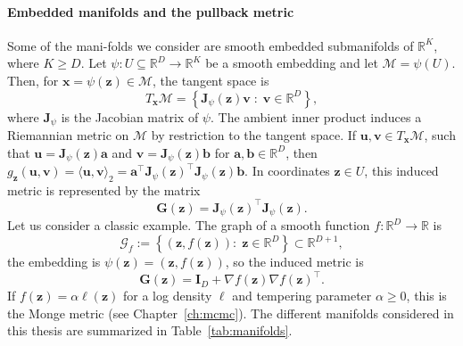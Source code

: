 \paragraph{Embedded manifolds and the pullback metric}
Some of the mani-folds we consider are smooth embedded submanifolds of  $\mathbb{R}^K$, where $K\geq D$. Let $\psi:U\subseteq\mathbb{R}^D\to \mathbb{R}^K$ be a smooth embedding and let $\mathcal{M}=\psi(U)$.
Then, for $\boldsymbol{x} = \psi(\boldsymbol{z})\in \mathcal{M}$, the tangent space is
\begin{equation*}
T_{\boldsymbol{x}}\mathcal{M}
=
\left\{
\mathbf{J}_{\psi}(\boldsymbol{z})\boldsymbol{v}
\;:\;
\boldsymbol{v}\in\mathbb{R}^D
\right\},
\end{equation*}
where  $\mathbf{J}_{\psi}$ is the Jacobian matrix of  $\psi$. 
The ambient inner product induces a Riemannian metric on $\mathcal{M}$ by restriction to the tangent space.
If $\boldsymbol{u},\boldsymbol{v}\in T_{\boldsymbol{x}}\mathcal{M}$, 
such that $\boldsymbol{u} = \mathbf{J}_{\psi}(\boldsymbol{z}) \boldsymbol{a}$ and $\boldsymbol{v} = \mathbf{J}_{\psi}(\boldsymbol{z}) \boldsymbol{b}$ for $\boldsymbol{a}, \boldsymbol{b}\in \mathbb{R}^D$,
then
$g_{\boldsymbol{z}}(\boldsymbol{u},\boldsymbol{v})=\langle \boldsymbol{u},\boldsymbol{v}\rangle_2 = 
 \boldsymbol{a}^\top \mathbf{J}_{\psi}(\boldsymbol{z})^\top \mathbf{J}_{\psi}(\boldsymbol{z}) \boldsymbol{b}
$.
In coordinates $\boldsymbol{z}\in U$, this induced metric is represented by the matrix
\begin{equation*}
\mathbf{G}(\boldsymbol{z})
=
\mathbf{J}_{\psi}(\boldsymbol{z})^\top \mathbf{J}_{\psi}(\boldsymbol{z}).
\end{equation*}
Let us consider a classic example. The graph of a smooth function $f:\mathbb{R}^D\to\mathbb{R}$ is
\begin{equation*}
\mathcal{G}_f
:=
\left\{
(\boldsymbol{z},f(\boldsymbol{z})):\;
\boldsymbol{z}\in\mathbb{R}^D
\right\}
\subset \mathbb{R}^{D+1},
\end{equation*}
the embedding is $\psi(\boldsymbol{z})=(\boldsymbol{z},f(\boldsymbol{z}))$, so the induced metric is
\begin{equation*}
\mathbf{G}(\boldsymbol{z})
=
\mathbf{I}_D+\nabla f(\boldsymbol{z})\nabla f(\boldsymbol{z})^\top.
\end{equation*}
If $f(\boldsymbol{z})=\alpha \ell(\boldsymbol{z})$ for a log density $\ell$ and
tempering parameter $\alpha\geq 0$, this is the Monge metric (see Chapter~\ref{ch:mcmc}).
The different manifolds considered in this thesis are summarized in Table~\ref{tab:manifolds}.
